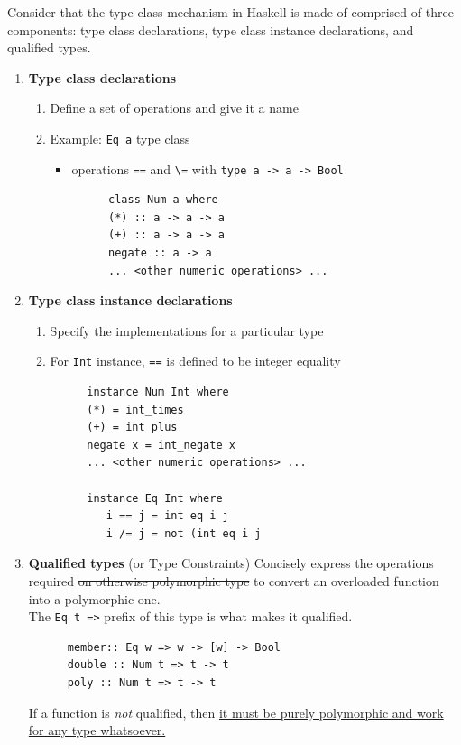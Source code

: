 Consider that the type class mechanism in Haskell is made of comprised of three components: type class
declarations, type class instance declarations, and qualified types.
\begin{enumerate}
   \item \textbf{Type class declarations}
   \begin{enumerate}
      \item Define a set of operations and give it a name
      \item Example: \lstinline|Eq a| type class
      \begin{itemize}
      	\item operations \lstinline|==| and \lstinline|\=| with \lstinline|type a -> a -> Bool|
      \end{itemize}
      \begin{lstlisting}
         class Num a where
         (*) :: a -> a -> a
         (+) :: a -> a -> a
         negate :: a -> a
         ... <other numeric operations> ...
      \end{lstlisting}
   \end{enumerate}
   \item \textbf{Type class instance declarations}
   \begin{enumerate}
      \item Specify the implementations for a particular type
      \item For \lstinline|Int| instance, \lstinline|==| is defined to be integer equality
   \end{enumerate}
   \begin{lstlisting}
         instance Num Int where
         (*) = int_times
         (+) = int_plus
         negate x = int_negate x
         ... <other numeric operations> ...

         instance Eq Int where
            i == j = int eq i j
            i /= j = not (int eq i j
   \end{lstlisting}
   \item \textbf{Qualified types} (or Type Constraints)
   Concisely express the operations required \st{on otherwise polymorphic type} to convert an overloaded
   function into a polymorphic one.\\
   The \lstinline|Eq t =>| prefix of this type is what makes it qualified.
   \begin{lstlisting}
      member:: Eq w => w -> [w] -> Bool
      double :: Num t => t -> t
      poly :: Num t => t -> t
   \end{lstlisting}
   If a function is \textit{not} qualified, then \ul{it must be purely polymorphic and work for any type whatsoever.}
\end{enumerate}

